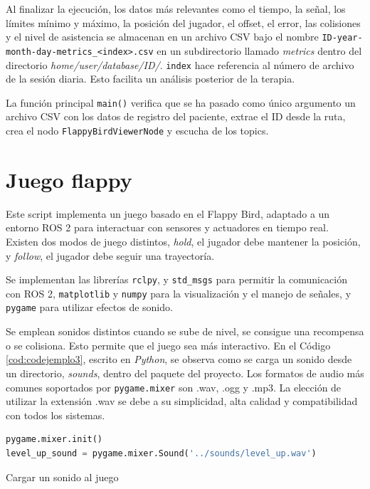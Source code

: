 Al finalizar la ejecución, los datos más relevantes como el tiempo, la señal, los límites mínimo y máximo, la posición del jugador, el offset, el error, las colisiones y el nivel de asistencia se almacenan en un archivo CSV bajo el nombre \verb|ID-year-month-day-metrics_<index>.csv| en un subdirectorio llamado \textit{metrics} dentro del directorio \textit{home/user/database/ID/}.
\verb|index| hace referencia al número de archivo de la sesión diaria.
Esto facilita un análisis posterior de la terapia.

La función principal \verb|main()| verifica que se ha pasado como único argumento un archivo CSV con los datos de registro del paciente, extrae el ID desde la ruta, crea el nodo \verb|FlappyBirdViewerNode| y escucha de los topics.

\section{Juego flappy}
\label{section:game}

Este script implementa un juego basado en el Flappy Bird, adaptado a un entorno ROS 2 para interactuar con sensores y actuadores en tiempo real.
Existen dos modos de juego distintos, \textit{hold}, el jugador debe mantener la posición, y \textit{follow}, el jugador debe seguir una trayectoría.

Se implementan las librerías \verb|rclpy|, y \verb|std_msgs| para permitir la comunicación con ROS 2, \verb|matplotlib| y \verb|numpy| para la visualización y el manejo de señales, y \verb|pygame| para utilizar efectos de sonido.

Se emplean sonidos distintos cuando se sube de nivel, se consigue una recompensa o se colisiona.
Esto permite que el juego sea más interactivo.
En el Código \ref{cod:codejemplo3}, escrito en \textit{Python}, se observa como se carga un sonido desde un directorio, \textit{sounds}, dentro del paquete del proyecto.
Los formatos de audio más comunes soportados por \verb|pygame.mixer| son .wav, .ogg y .mp3.
La elección de utilizar la extensión .wav se debe a su simplicidad, alta calidad y compatibilidad con todos los sistemas.

\begin{code}[h]
\begin{lstlisting}[language=Python]
pygame.mixer.init()
level_up_sound = pygame.mixer.Sound('../sounds/level_up.wav')
\end{lstlisting}
\caption[Cargar un sonido al juego]{Cargar un sonido al juego}
\label{cod:codejemplo3}
\end{code}

